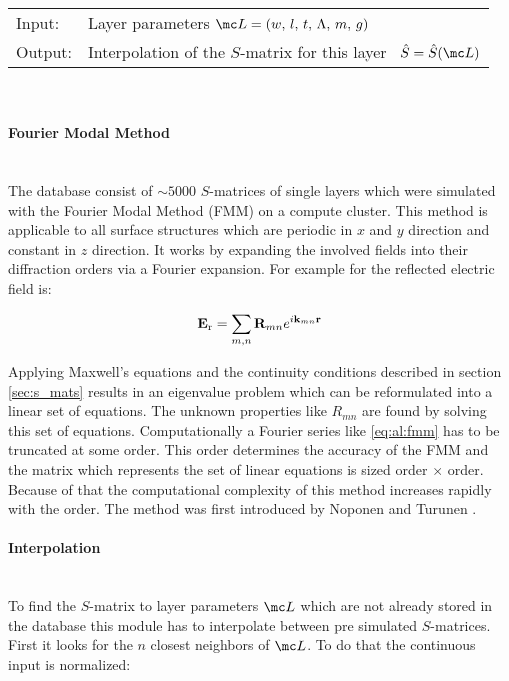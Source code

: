 \begin{tabular}{ll}
    \toprule
    Input: & Layer parameters 
    $\mc L = (w, \, l, \, t, \, \Lambda, \, m, \, g)$\\
    Output: & Interpolation of the $S$-matrix for this layer \
    $\hat{S} = \hat{S}(\mc L)$\\
    \bottomrule
\end{tabular}
\\

\paragraph{Fourier Modal Method} ~\\ \label{sec:FMM}
The database consist of $\sim 5000$ $S$-matrices of single layers which were simulated with the Fourier Modal Method (FMM) on a compute cluster. This method is applicable to all surface structures which are periodic in $x$ and $y$ direction and constant in $z$ direction. It works by expanding the involved fields into their diffraction orders via a Fourier expansion. For example for the reflected electric field is:

\begin{equation} \label{eq:al:fmm}
    \vb E_{\mathrm{r}} = \sum_{m,n} \vb R_{mn} e^{i \vb k_{mn} \vb r}
\end{equation}

Applying Maxwell's equations and the continuity conditions described in section \ref{sec:s_mats} results in an eigenvalue problem which can be reformulated into a linear set of equations. The unknown properties like $R_{mn}$ are found by solving this set of equations. Computationally a Fourier series like \eqref{eq:al:fmm} has to be truncated at some order. This order determines the accuracy of the FMM and the matrix which represents the set of linear equations is sized order $\times$ order. Because of that the computational complexity of this method increases rapidly with the order. The method was first introduced by Noponen and Turunen \cite{Noponen1994}.

\paragraph{Interpolation} ~\\
To find the $S$-matrix to layer parameters $\mc L$ which are not already stored in the database this module has to interpolate between pre simulated $S$-matrices. First it looks for the $n$ closest neighbors of $\mc L$. To do that the continuous input is normalized:

